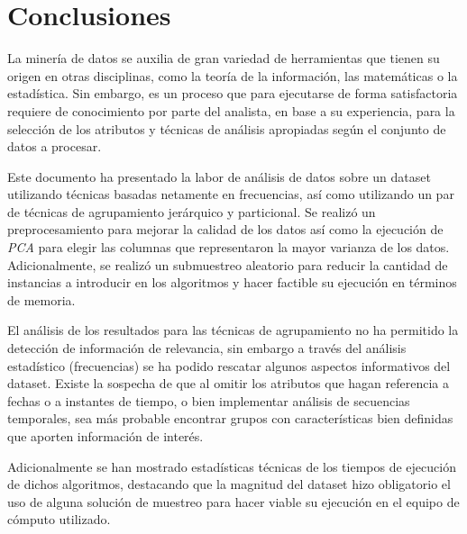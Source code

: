 \documentclass[12pt]{article}
\numberwithin{equation}{section}
\numberwithin{table}{section}
\numberwithin{figure}{section}
\begin{document}
\pagebreak
\section{Conclusiones}
La minería de datos se auxilia de gran variedad de herramientas que tienen su origen en otras disciplinas, como la teoría de la información, las matemáticas o la estadística. Sin embargo, es un proceso que para ejecutarse de forma satisfactoria requiere de conocimiento por parte del analista, en base a su experiencia, para la selección de los atributos y técnicas de análisis apropiadas según el conjunto de datos a procesar.

Este documento ha presentado la labor de análisis de datos sobre un dataset utilizando técnicas basadas netamente en frecuencias, así como utilizando un par de técnicas de agrupamiento jerárquico y particional.
Se realizó un preprocesamiento para mejorar la calidad de los datos así como la ejecución de \emph{PCA} para elegir las columnas que representaron la mayor varianza de los datos. Adicionalmente, se realizó un submuestreo aleatorio para reducir la cantidad de instancias a introducir en los algoritmos y hacer factible su ejecución en términos de memoria.

El análisis de los resultados para las técnicas de agrupamiento no ha permitido la detección de información de relevancia, sin embargo a través del análisis estadístico (frecuencias) se ha podido rescatar algunos aspectos informativos del dataset.
Existe la sospecha de que al omitir los atributos que hagan referencia a fechas o a instantes de tiempo, o bien implementar análisis de secuencias temporales, sea más probable encontrar grupos con características bien definidas que aporten información de interés.

Adicionalmente se han mostrado estadísticas técnicas de los tiempos de ejecución de dichos algoritmos, destacando que la magnitud del dataset hizo obligatorio el uso de alguna solución de muestreo para hacer viable su ejecución en el equipo de cómputo utilizado.
\end{document}
